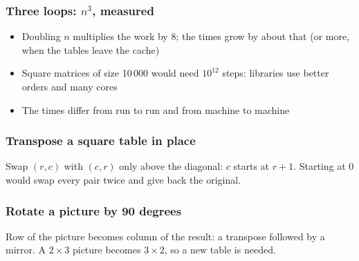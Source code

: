 \documentclass[aspectratio=169,10pt,compress]{beamer}
\begin{document}
\begin{frame}[t,fragile] \frametitle{Three loops: $n^{3}$, measured}

	\begin{itemize}\footnotesize
		\item Doubling $n$ multiplies the work by 8; the times grow by about that (or more, when the tables leave the cache)
		\item Square matrices of size 10\,000 would need $10^{12}$ steps: libraries use better orders and many cores
		\item The times differ from run to run and from machine to machine
	\end{itemize}
\end{frame}




\begin{frame}[t,fragile] \frametitle{Transpose a square table in place}

	\footnotesize Swap $(r, c)$ with $(c, r)$ only above the diagonal: $c$ starts at $r + 1$.
	Starting at 0 would swap every pair twice and give back the original.
\end{frame}




\begin{frame}[t,fragile] \frametitle{Rotate a picture by 90 degrees}

	\footnotesize Row  of the picture becomes column  of the result:
	a transpose followed by a mirror. A $2 \times 3$ picture becomes $3 \times 2$, so a new table is needed.
\end{frame}




\end{document}
